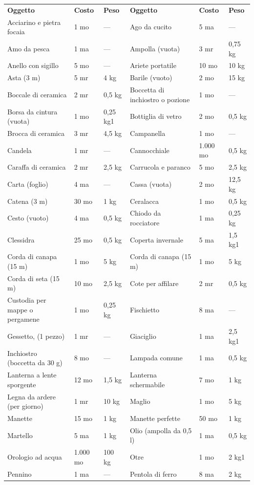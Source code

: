 \documentclass[a4paper,11pt,twoside,openany]{book}
\begin{document}
{\begin{longtable}{|L{4cm} |k{1.5cm} |k{1.5cm}|L{5cm} |k{1.5cm} |k{1.5cm}|}
\textbf{Oggetto}&	\textbf{Costo}	& \textbf{Peso}&\textbf{Oggetto}&	\textbf{Costo}	&\textbf{Peso}\\
Acciarino e pietra focaia	&1 mo&	— & 	Ago da cucito&	5 ma&	—\\
Amo da pesca&	1 ma&	—&	Ampolla (vuota)&	3 mr&	0,75 kg\\
Anello con sigillo&	5 mo&	—&	Ariete portatile&	10 mo	&10 kg\\
Asta (3 m)&	5 mr&	4 kg&	Barile (vuoto)&	2 mo&	15 kg\\
Boccale di ceramica	&2 mr&	0,5 kg&	Boccetta di inchiostro o pozione&	1 mo&	—\\
Borsa da cintura (vuota)&	1 mo&	0,25 kg1&	Bottiglia di vetro&	2 mo&	0,5 kg\\
Brocca di ceramica&	3 mr&	4,5 kg&	Campanella&	1 mo&	—\\
Candela&	1 mr&	—&	Cannocchiale&	1.000 mo&	0,5 kg\\
Caraffa di ceramica&	2 mr&	2,5 kg&	Carrucola e paranco&	5 mo&	2,5 kg\\
Carta (foglio)&	4 ma&	—&	Cassa (vuota)&	2 mo&	12,5 kg\\
Catena (3 m)&	30 mo&	1 kg&	Ceralacca&	1 mo&	0,5 kg\\
Cesto (vuoto)&	4 ma&	0,5 kg&	Chiodo da rocciatore&	1 ma&	0,25 kg\\
Clessidra&	25 mo	&0,5 kg&	Coperta invernale&	5 ma&	1,5 kg1\\
Corda di canapa (15 m)	&1 mo&	5 kg&	Corda di canapa (15 m)&1 mo&5 kg\\
Corda di seta (15 m)&10 mo&2,5 kg&	Cote per affilare&2 mr&0,5 kg\\
Custodia per mappe o pergamene&1 mo&0,25 kg&	Fischietto&8 ma&—\\
Gessetto, (1 pezzo)&1 mr&—&	Giaciglio&1 ma&2,5 kg1\\
Inchiostro (boccetta da 30 g)&8 mo&—&	Lampada comune&1 ma&0,5 kg\\
Lanterna a lente sporgente&12 mo&1,5 kg&	Lanterna schermabile&7 mo&1 kg\\
Legna da ardere (per giorno)&1 mr&10 kg&	Maglio&1 mo&5 kg\\
Manette&15 mo&1 kg&	Manette perfette&50 mo&1 kg\\
Martello&5 ma&1 kg&	Olio (ampolla da 0,5 l)&1 ma&0,5 kg\\
Orologio ad acqua&1.000 mo&100 kg&	Otre&1 mo&2 kg1\\
Pennino&1 ma&—&	Pentola di ferro&8 ma&2 kg\\

\end{longtable}}
\end{document}

